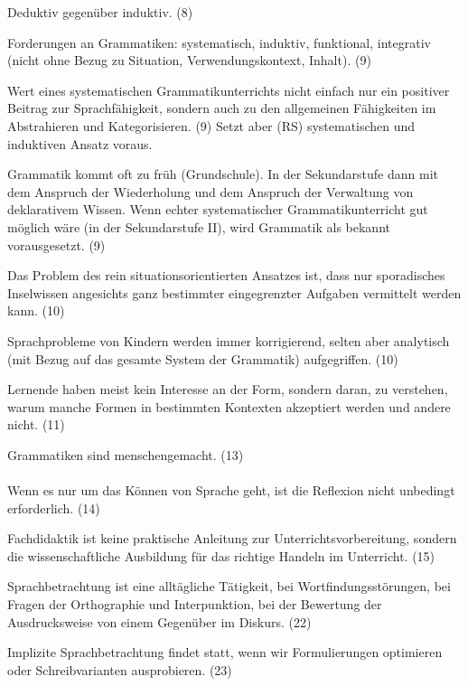 Deduktiv gegenüber induktiv. (8)

Forderungen an Grammatiken: systematisch, induktiv, funktional, integrativ (nicht ohne Bezug zu Situation, Verwendungskontext, Inhalt). (9)

Wert eines systematischen Grammatikunterrichts nicht einfach nur ein positiver Beitrag zur Sprachfähigkeit, sondern auch zu den allgemeinen Fähigkeiten im Abstrahieren und Kategorisieren. (9) Setzt aber (RS) systematischen und induktiven Ansatz voraus.

Grammatik kommt oft zu früh (Grundschule).
In der Sekundarstufe dann mit dem Anspruch der Wiederholung und dem Anspruch der Verwaltung von deklarativem Wissen.
Wenn echter systematischer Grammatikunterricht gut möglich wäre (in der Sekundarstufe II), wird Grammatik als bekannt vorausgesetzt. (9)

Das Problem des rein situationsorientierten Ansatzes ist, dass nur sporadisches Inselwissen angesichts ganz bestimmter eingegrenzter Aufgaben vermittelt werden kann. (10)

Sprachprobleme von Kindern werden immer korrigierend, selten aber analytisch (mit Bezug auf das gesamte System der Grammatik) aufgegriffen. (10)

Lernende haben meist kein Interesse an der Form, sondern daran, zu verstehen, warum manche Formen in bestimmten Kontexten akzeptiert werden und andere nicht. (11)

Grammatiken sind menschengemacht. (13)



\paragraph{\citet{Bredel2013}}

Wenn es nur um das Können von Sprache geht, ist die Reflexion nicht unbedingt erforderlich. (14)

Fachdidaktik ist keine praktische Anleitung zur Unterrichtsvorbereitung, sondern die wissenschaftliche Ausbildung für das richtige Handeln im Unterricht. (15)

Sprachbetrachtung ist eine alltägliche Tätigkeit, \zB bei Wortfindungsstörungen, bei Fragen der Orthographie und Interpunktion, bei der Bewertung der Ausdrucksweise von einem Gegenüber im Diskurs. (22)

Implizite Sprachbetrachtung findet statt, wenn wir \zB Formulierungen optimieren oder Schreibvarianten ausprobieren. (23)

